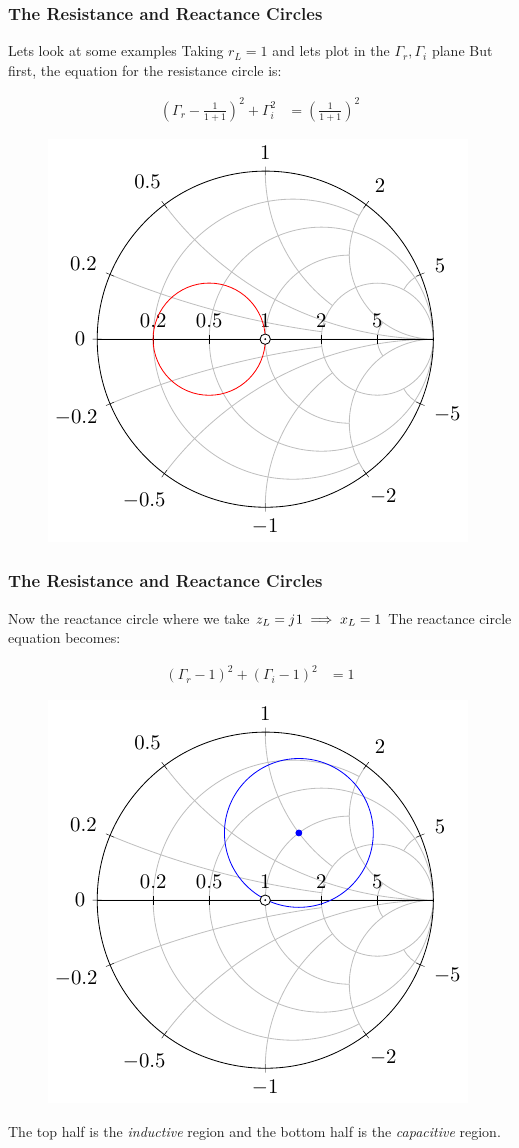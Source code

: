 \documentclass[10pt, compress]{beamer}
\renewcommand{\j}{{j}\mkern1mu} %
\begin{document}
\begin{frame}
    \frametitle{The Resistance and Reactance Circles}
    \begin{outline}
        \1 Lets look at some examples
        \2 Taking $r_L = 1$ and lets plot in the $\Gamma_r ,\Gamma_i$ plane
        \2 But first, the equation for the resistance circle is:
    \end{outline}
    \begin{align*}
        \left(\Gamma_{r} - \frac{1}{1+1}\right)^{2} + \Gamma_{i}^{2} & = \left(\frac{1}{1+1}\right)^{2}
    \end{align*}
    \begin{figure}[h]
        \centering
        \includegraphics[width=.4\textwidth]{smith_resistance.pdf}
    \end{figure}
\end{frame}

\begin{frame}
    \frametitle{The Resistance and Reactance Circles}

    \begin{outline}
        \1 Now the reactance circle where we take $z_L = \j 1 \implies x_L = 1$
        \1 The reactance circle equation becomes:
    \end{outline}
    \begin{align*}
        \left(\Gamma_{r}-1\right)^{2}+\left(\Gamma_{i}-1\right)^{2} & = 1
    \end{align*}
    \begin{figure}[h]
        \centering
        \includegraphics[width=.4\textwidth]{smith_reactance_circle.pdf}
    \end{figure}
    The top half is the \textit{inductive} region and the bottom half is the \textit{capacitive} region.
\end{frame}
\end{document}
